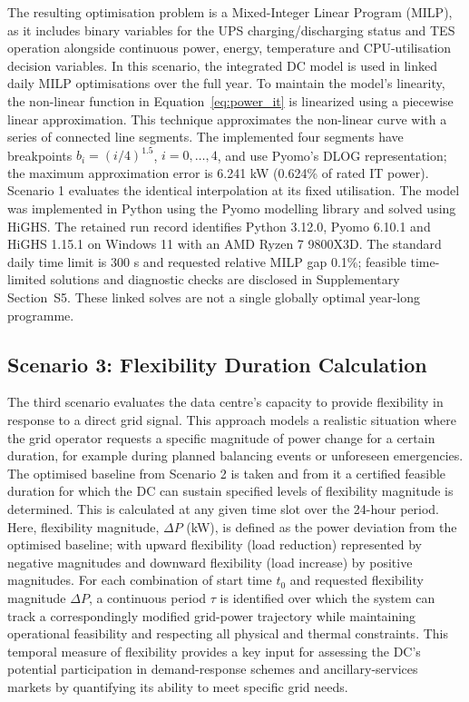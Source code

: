 \documentclass[lettersize,journal]{IEEEtran}
\newcommand{\rev}[1]{#1}
\begin{document}
\rev{The resulting optimisation problem is a Mixed-Integer Linear Program (MILP), as it includes binary variables for the UPS charging/discharging status and TES operation alongside continuous power, energy, temperature and CPU-utilisation decision variables.} In this scenario, the integrated DC model is used in linked daily MILP optimisations over the full year. To maintain the model's linearity, the non-linear function in Equation~\ref{eq:power_it} is linearized using a piecewise linear approximation. This technique approximates the non-linear curve with a series of connected line segments. The implemented four segments have breakpoints $b_i=(i/4)^{1.5}$, $i=0,\ldots,4$, and use Pyomo's DLOG representation; the maximum approximation error is 6.241 kW (0.624\% of rated IT power). Scenario 1 evaluates the identical interpolation at its fixed utilisation. The model was implemented in Python using the Pyomo modelling library and solved using HiGHS. The retained run record identifies Python 3.12.0, Pyomo 6.10.1 and HiGHS 1.15.1 on Windows 11 with an AMD Ryzen 7 9800X3D. The standard daily time limit is 300 s and requested relative MILP gap 0.1\%; feasible time-limited solutions and diagnostic checks are disclosed in Supplementary Section~S5. These linked solves are not a single globally optimal year-long programme.





\subsection{Scenario 3: Flexibility Duration Calculation}\label{sec:scenario 3}
The third scenario evaluates the data centre's capacity to provide flexibility in response to a direct grid signal. This approach models a realistic situation where the grid operator requests a specific magnitude of power change for a certain duration, for example during planned balancing events or unforeseen emergencies. The optimised baseline from Scenario 2 is taken and from it a certified feasible duration for which the DC can sustain specified levels of flexibility magnitude is determined. This is calculated at any given time slot over the 24-hour period. Here, flexibility magnitude, $\Delta P$ (kW), is defined as the power deviation from the optimised baseline; with upward flexibility (load reduction) represented by negative magnitudes and downward flexibility (load increase) by positive magnitudes. For each combination of start time $t_0$ and requested flexibility magnitude $\Delta P$, a continuous period $\tau$ is identified over which the system can track a correspondingly modified grid-power trajectory while maintaining operational feasibility and respecting all physical and thermal constraints. This temporal measure of flexibility provides a key input for assessing the DC's potential participation in demand-response schemes and ancillary-services markets by quantifying its ability to meet specific grid needs.
\end{document}
